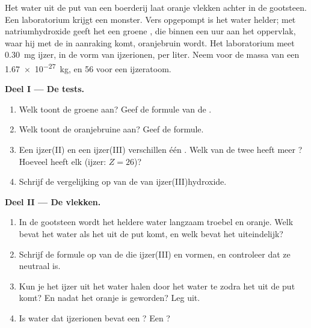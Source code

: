 \begin{problem}
\label{pb:g9:ions:1}
Het water uit de put van een boerderij laat oranje vlekken achter in de
gootsteen. Een laboratorium krijgt een monster. Vers opgepompt is het
water helder; met natriumhydroxide geeft het een groene , die
binnen een uur aan het oppervlak, waar hij met de  in aanraking
komt, oranjebruin wordt. Het laboratorium meet \qty{0.30}{mg} ijzer, in
de vorm van ijzerionen, per liter. Neem voor de massa van een 
\qty{1.67e-27}{kg}, en 56  voor een ijzeratoom.

\medskip
\noindent\textbf{Deel I --- De tests.}
\begin{enumerate}
  \item Welk  toont de groene  aan? Geef de formule van de
        .
  \item Welk  toont de oranjebruine  aan? Geef de formule.
  \item Een ijzer(II) en een ijzer(III) verschillen één .
        Welk van de twee heeft meer ? Hoeveel  heeft
        elk (ijzer: $Z = 26$)?
  \item Schrijf de vergelijking op van de  van
        ijzer(III)hydroxide.
\end{enumerate}

\medskip
\noindent\textbf{Deel II --- De vlekken.}
\begin{enumerate}[resume]
  \item In de gootsteen wordt het heldere water langzaam troebel en
        oranje. Welk  bevat het water als het uit de put komt, en
        welk bevat het uiteindelijk?
  \item Schrijf de formule op van de  die ijzer(III) en
         vormen, en controleer dat ze neutraal is.
  \item Kun je het ijzer uit het water halen door het water te
         zodra het uit de put komt? En nadat het oranje is
        geworden? Leg uit.
  \item Is water dat ijzerionen bevat een ? Een ?
\end{enumerate}


\end{problem}
